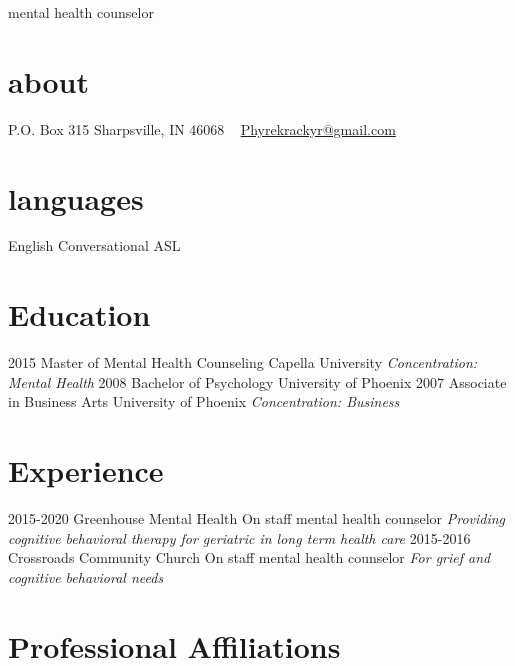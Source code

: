 \documentclass[]{friggeri-cv}
\begin{document}
       {mental health counselor}


\begin{aside}
  \section{about}
    P.O. Box 315
    Sharpsville, IN 46068
    ~
    \href{mailto:Phyrekrackyr@gmail.com}{Phyrekrackyr@gmail.com}
  \section{languages}
    English 
    Conversational ASL
\end{aside}
\iffalse
\section{Certifications}
\begin{entrylist}
	\entry
	{since 2015}
	{Mental Health Counselor {\normalfont  Associates License}}
	{}
	{}
\end{entrylist}
\fi
\section{Education}

\begin{entrylist}
  \entry
    {2015}
    {Master of Mental Health Counseling}
    {Capella University}
    {\emph{Concentration: Mental Health}}
  \entry
    {2008}
    {Bachelor of Psychology}
    {University of Phoenix}
    {}
  \entry
    {2007}
    {Associate in Business Arts}
    {University of Phoenix}
    {\emph{Concentration: Business}}
\end{entrylist}

\section{Experience}

\begin{entrylist}
  \entry
    {2015-2020}
    {Greenhouse Mental Health}
    {On staff mental health counselor}
    {\emph{Providing cognitive behavioral therapy for geriatric in long term health care}}
  \entry
    {2015-2016}
    {Crossroads Community Church}
    {On staff mental health counselor }
    {\emph{For grief and cognitive behavioral needs}}
\end{entrylist}

\section{Professional Affiliations}
\end{document}
